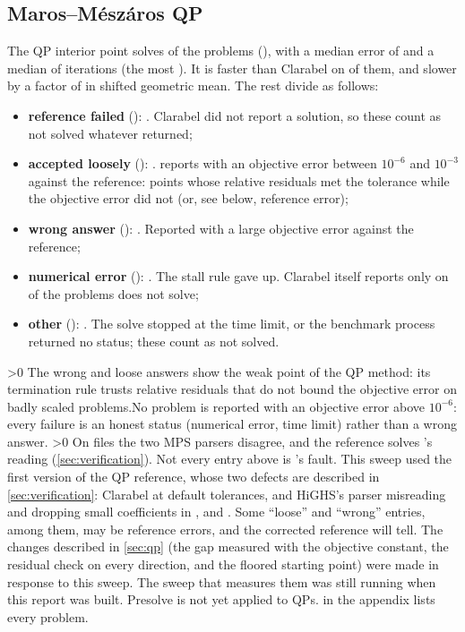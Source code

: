 \subsection{Maros--Mészáros QP}
The QP interior point solves \nQp{} of the \nQpTot{} problems (\file{\qpFile}), with a median error of
\medErrQp{} and a median of \medItQp{} iterations (the most \maxItQp). It is faster than Clarabel on
\nFasterQp{} of them, and slower by a factor of \ratioQp{} in shifted geometric mean. The rest divide as
follows:
\begin{itemize}
  \item \textbf{reference failed} (\nQpRefBad): \qpRefBadNames. Clarabel did not report a solution,
        so these count as not solved whatever \nirnay{} returned;
  \item \textbf{accepted loosely} (\nQpLoose): \qpLooseNames. \nirnay{} reports  with an
        objective error between $10^{-6}$ and $10^{-3}$ against the reference: points whose relative
        residuals met the tolerance while the objective error did not (or, see below, reference error);
  \item \textbf{wrong answer} (\nQpWrongBig): \qpWrongBigNames. Reported  with a large
        objective error against the reference;
  \item \textbf{numerical error} (\nQpNumErr): \qpNumErrNames. The stall rule gave up. Clarabel itself
        reports only  on \nQpAlmostRef{} of the problems \nirnay{} does not solve;
  \item \textbf{other} (\nQpOther): \qpOtherNames. The solve stopped at the time limit, or the
        benchmark process returned no status; these count as not solved.
\end{itemize}
\ifnum\nQpLooseOrWrong>0 The wrong and loose answers show the weak point of the QP method: its
termination rule trusts relative residuals that do not bound the objective error on badly scaled
problems.\else No problem is reported  with an objective error above $10^{-6}$: every
failure is an honest status (numerical error, time limit) rather than a wrong answer.\fi{}
\ifnum\nQpRefAnnotated>0 On \nQpRefAnnotated{} files the two MPS parsers disagree, and the reference
solves \nirnay{}'s reading (\cref{sec:verification}).\fi{}
\ifnum{} Not every entry above is \nirnay{}'s fault. This sweep used the first version of the
QP reference, whose two defects are described in \cref{sec:verification}: Clarabel at default
tolerances, and HiGHS's parser misreading  and dropping small coefficients in
,  and . Some ``loose'' and ``wrong'' entries,  among
them, may be reference errors, and the corrected reference will tell. The changes described in \cref{sec:qp} (the gap measured with the objective
constant, the residual check on every direction, and the floored starting point) were made in response
to this sweep. \ifnum{} The sweep that measures them was still running when this report was
built.\fi\fi{} Presolve is not yet applied to QPs.  in the appendix lists every
problem.
